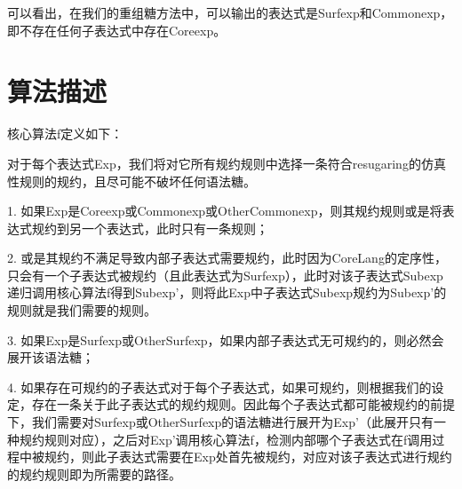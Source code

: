 可以看出，在我们的重组糖方法中，可以输出的表达式是Surfexp和Commonexp，即不存在任何子表达式中存在Coreexp。


\section{算法描述}

核心算法f定义如下：

对于每个表达式Exp，我们将对它所有规约规则中选择一条符合resugaring的仿真性规则的规约，且尽可能不破坏任何语法糖。

1.	如果Exp是Coreexp或Commonexp或OtherCommonexp，则其规约规则或是将表达式规约到另一个表达式，此时只有一条规则；

2.	或是其规约不满足导致内部子表达式需要规约，此时因为CoreLang的定序性，只会有一个子表达式被规约（且此表达式为Surfexp），此时对该子表达式Subexp递归调用核心算法f得到Subexp’，则将此Exp中子表达式Subexp规约为Subexp’的规则就是我们需要的规则。

3.	如果Exp是Surfexp或OtherSurfexp，如果内部子表达式无可规约的，则必然会展开该语法糖；

4.	如果存在可规约的子表达式对于每个子表达式，如果可规约，则根据我们的设定，存在一条关于此子表达式的规约规则。因此每个子表达式都可能被规约的前提下，我们需要对Surfexp或OtherSurfexp的语法糖进行展开为Exp’（此展开只有一种规约规则对应），之后对Exp’调用核心算法f，检测内部哪个子表达式在f调用过程中被规约，则此子表达式需要在Exp处首先被规约，对应对该子表达式进行规约的规约规则即为所需要的路径。
